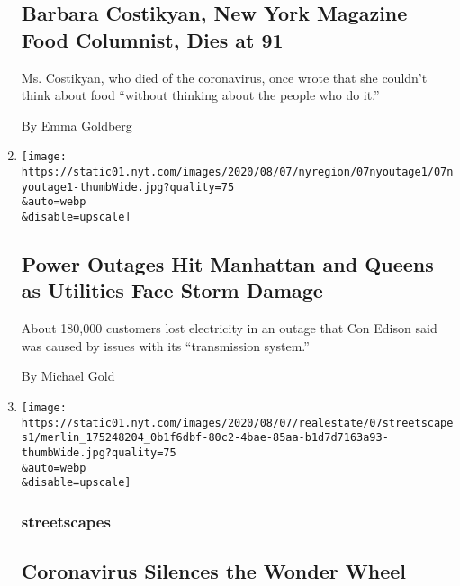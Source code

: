 \begin{enumerate}
  \hypertarget{barbara-costikyan-new-york-magazine-food-columnist-dies-at-91}{%
  \subsection{Barbara Costikyan, New York Magazine Food Columnist, Dies
  at
  91}\label{barbara-costikyan-new-york-magazine-food-columnist-dies-at-91}}

  Ms. Costikyan, who died of the coronavirus, once wrote that she
  couldn't think about food ``without thinking about the people who do
  it.''

  By Emma Goldberg
\item
  \href{/2020/08/07/nyregion/queens-manhattan-west-side-power-outage-coned.html}{}

  \texttt{[image: https://static01.nyt.com/images/2020/08/07/nyregion/07nyoutage1/07nyoutage1-thumbWide.jpg?quality=75\\\&auto=webp\\\&disable=upscale]}

  \hypertarget{power-outages-hit-manhattan-and-queens-as-utilities-face-storm-damage}{%
  \subsection{Power Outages Hit Manhattan and Queens as Utilities Face
  Storm
  Damage}\label{power-outages-hit-manhattan-and-queens-as-utilities-face-storm-damage}}

  About 180,000 customers lost electricity in an outage that Con Edison
  said was caused by issues with its ``transmission system.''

  By Michael Gold
\item
  \href{/2020/08/07/realestate/coronavirus-coney-island-wonder-wheel.html}{}

  \texttt{[image: https://static01.nyt.com/images/2020/08/07/realestate/07streetscapes1/merlin\_175248204\_0b1f6dbf-80c2-4bae-85aa-b1d7d7163a93-thumbWide.jpg?quality=75\\\&auto=webp\\\&disable=upscale]}

  \hypertarget{streetscapes}{%
  \subsubsection{streetscapes}\label{streetscapes}}

  \hypertarget{coronavirus-silences-the-wonder-wheel}{%
  \subsection{Coronavirus Silences the Wonder
  Wheel}\label{coronavirus-silences-the-wonder-wheel}}


\end{enumerate}
